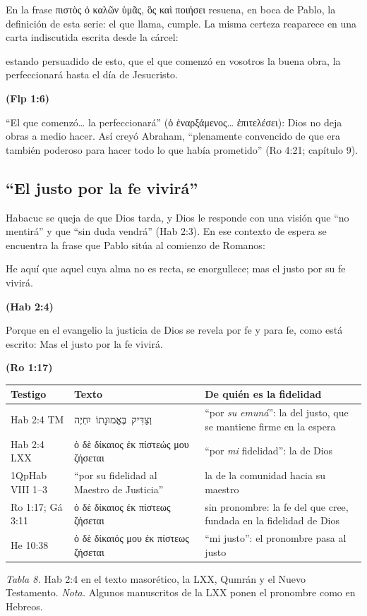 \documentclass[11pt,letterpaper]{article}
\newcommand{\heb}[1]{\mbox{\foreignlanguage{hebrew}{#1}}}
\newcommand{\grc}[1]{\foreignlanguage{ancientgreek}{#1}}
\newcommand{\hebverso}[1]{\par\smallskip{\centering\begin{otherlanguage}{hebrew}\large #1\end{otherlanguage}\par}\smallskip}
\newcommand{\fuente}[1]{\par\hfill{\upshape\bfseries\small\textcolor{azul}{#1}}}
\begin{document}
En la frase \grc{πιστὸς ὁ καλῶν ὑμᾶς, ὃς καὶ ποιήσει} resuena, en boca de Pablo, la definición de esta serie: el que llama, cumple. La misma certeza reaparece en una carta indiscutida escrita desde la cárcel:

\begin{cita}estando persuadido de esto, que el que comenzó en vosotros la buena obra, la perfeccionará hasta el día de Jesucristo.\fuente{(Flp 1:6)}\end{cita}

``El que comenzó\ldots{} la perfeccionará'' (\grc{ὁ ἐναρξάμενος\ldots{} ἐπιτελέσει}): Dios no deja obras a medio hacer. Así creyó Abraham, ``plenamente convencido de que era también poderoso para hacer todo lo que había prometido'' (Ro 4:21; capítulo 9).

\subsection{``El justo por la fe vivirá''}
Habacuc se queja de que Dios tarda, y Dios le responde con una visión que ``no mentirá'' y que ``sin duda vendrá'' (Hab 2:3). En ese contexto de espera se encuentra la frase que Pablo sitúa al comienzo de Romanos:

\hebverso{וְצַדִּיק בֶּאֱמוּנָתוֹ יִחְיֶה}
\begin{cita}He aquí que aquel cuya alma no es recta, se enorgullece; mas el justo por su fe vivirá.\fuente{(Hab 2:4)}\end{cita}
\begin{cita}Porque en el evangelio la justicia de Dios se revela por fe y para fe, como está escrito: Mas el justo por la fe vivirá.\fuente{(Ro 1:17)}\end{cita}

\begin{center}\small\renewcommand{\arraystretch}{1.25}
\begin{tabular}{@{}L{2.6cm}L{6.2cm}L{5.6cm}@{}}
\toprule
\textbf{Testigo} & \textbf{Texto} & \textbf{De quién es la fidelidad} \\ \midrule
Hab 2:4 TM & \heb{וְצַדִּיק בֶּאֱמוּנָתוֹ יִחְיֶה} & ``por \emph{su} \emph{emuná}'': la del justo, que se mantiene firme en la espera \\
Hab 2:4 LXX & \grc{ὁ δὲ δίκαιος ἐκ πίστεώς μου ζήσεται} & ``por \emph{mi} fidelidad'': la de Dios \\
1QpHab VIII 1--3 & ``por su fidelidad al Maestro de Justicia'' & la de la comunidad hacia su maestro \\
Ro 1:17; Gá 3:11 & \grc{ὁ δὲ δίκαιος ἐκ πίστεως ζήσεται} & sin pronombre: la fe del que cree, fundada en la fidelidad de Dios \\
He 10:38 & \grc{ὁ δὲ δίκαιός μου ἐκ πίστεως ζήσεται} & ``mi justo'': el pronombre pasa al justo \\
\bottomrule
\end{tabular}\par
{\footnotesize\color{gris}\textit{Tabla 8.} Hab 2:4 en el texto masorético, la LXX, Qumrán y el Nuevo Testamento. \textit{Nota.} Algunos manuscritos de la LXX ponen el pronombre como en Hebreos.}
\end{center}
\end{document}
